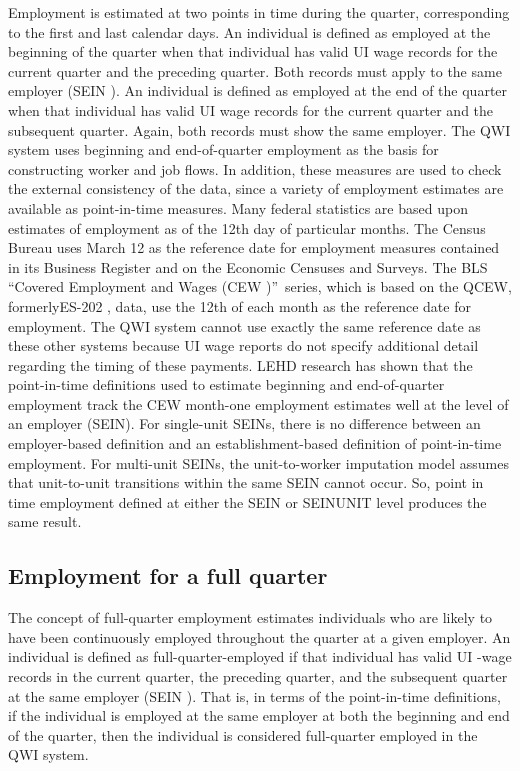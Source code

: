 Employment is estimated at two points in time during the quarter,
corresponding to the first and last calendar days. An individual is defined
as employed at the beginning of the quarter when that individual has valid UI%
 wage records for the current quarter and the preceding quarter.
Both records must apply to the same employer (SEIN%
). An individual is defined as employed at the end of the
quarter when that individual has valid {UI} wage records for the current
quarter and the subsequent quarter. Again, both records must show the same
employer. The QWI system uses beginning and end-of-quarter employment as the
basis for constructing worker and job flows. In addition, these measures are
used to check the external consistency of the data, since a variety of
employment estimates are available as point-in-time measures. Many federal
statistics are based upon estimates of employment as of the 12th day of
particular months. The Census Bureau uses March 12 as the reference date for
employment measures contained in its Business Register and on the Economic
Censuses and Surveys. The BLS%
 \textquotedblleft Covered Employment and Wages (CEW%
)\textquotedblright\ series, which is based on the QCEW, formerlyES-202%
, data, use the 12th of each month as the reference date for
employment. The QWI system cannot use exactly the same reference date as
these other systems because {UI} wage reports do not specify additional
detail regarding the timing of these payments. LEHD research has shown that
the point-in-time definitions used to estimate beginning and end-of-quarter
employment track the CEW month-one employment estimates well at the level of
an employer ({SEIN}). For single-unit SEINs, there is no difference between
an employer-based definition and an establishment-based definition of
point-in-time employment. For multi-unit SEINs, the unit-to-worker
imputation model assumes that unit-to-unit transitions within the same SEIN
cannot occur. So, point in time employment defined at either the SEIN or
SEINUNIT level produces the same result.

\subsection{Employment for a full quarter}


The concept of full-quarter employment estimates individuals who are likely
to have been continuously employed throughout the quarter at a given
employer. An individual is defined as full-quarter-employed if that
individual has valid UI%
-wage records in the current quarter, the preceding quarter, and
the subsequent quarter at the same employer (SEIN%
). That is, in terms of the point-in-time definitions, if the
individual is employed at the same employer at both the beginning and end of
the quarter, then the individual is considered full-quarter employed in the
QWI system.

